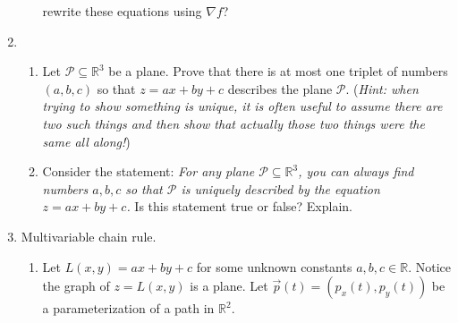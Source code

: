 \documentclass[letter]{article}
\newcommand{\R}{\mathbb{R}}
\begin{document}
\begin{enumerate}
\begin{enumerate}
				rewrite these equations using $\nabla f$?
		\end{enumerate}
		\item \begin{enumerate}
			\item Let $\mathcal P\subseteq \R^3$ be a plane. Prove that there is at most one triplet
			of numbers $(a,b,c)$ so that $z=ax+by+c$ describes the plane $\mathcal P$.  
			(\emph{Hint: when trying to show something is unique, it is often useful to 
			assume there are two such things and then show that actually those two things were the
			same all along!})
			\item Consider the statement: \emph{For any plane $\mathcal P\subseteq \R^3$, you can always find numbers
				$a,b,c$ so that $\mathcal P$ is uniquely described by the equation $z=ax+by+c$.}
				Is this statement true or false?  Explain.
		\end{enumerate}
		\item {\sc Multivariable chain rule}.
			\begin{enumerate}
				\item Let $L(x,y)=ax+by+c$ for some unknown constants $a,b,c\in\R$.  Notice
					the graph of $z=L(x,y)$ is a plane.  Let $\vec p(t) = (p_x(t), p_y(t))$
					be a parameterization of a path in $\R^2$.


\end{enumerate}
\end{enumerate}
\end{document}

